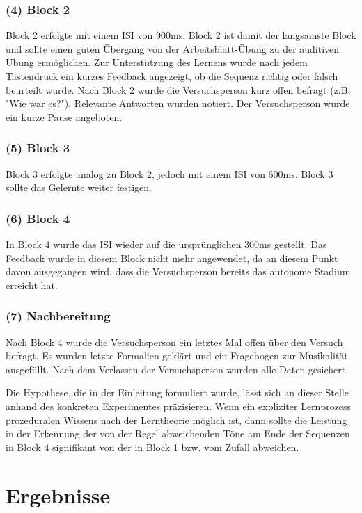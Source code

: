 \documentclass[doc,a4paper,12pt]{apa6}
\begin{document}
\subsubsection{(4) Block 2}

Block 2 erfolgte mit einem ISI von 900ms. Block 2 ist damit der langsamste Block und sollte einen guten Übergang von der Arbeitsblatt-Übung zu der auditiven Übung ermöglichen. Zur Unterstützung des Lernens wurde nach jedem Tastendruck ein kurzes Feedback angezeigt, ob die Sequenz richtig oder falsch beurteilt wurde. Nach Block 2 wurde die Versuchsperson kurz offen befragt (z.B. "Wie war es?"). Relevante Antworten wurden notiert. Der Versuchsperson wurde ein kurze Pause angeboten.

\subsubsection{(5) Block 3}

Block 3 erfolgte analog zu Block 2, jedoch mit einem ISI von 600ms. Block 3 sollte das Gelernte weiter festigen.

\subsubsection{(6) Block 4}

In Block 4 wurde das ISI wieder auf die ursprünglichen 300ms gestellt. Das Feedback wurde in diesem Block nicht mehr angewendet, da an diesem Punkt davon ausgegangen wird, dass die Versuchsperson bereits das autonome Stadium erreicht hat.

\subsubsection{(7) Nachbereitung}

Nach Block 4 wurde die Versuchsperson ein letztes Mal offen über den Versuch befragt. Es wurden letzte Formalien geklärt und ein Fragebogen zur Musikalität ausgefüllt. Nach dem Verlassen der Versuchsperson wurden alle Daten gesichert.

Die Hypothese, die in der Einleitung formuliert wurde, lässt sich an dieser Stelle anhand des konkreten Experimentes präzisieren. Wenn ein expliziter Lernprozess prozeduralen Wissens nach der Lerntheorie möglich ist, dann sollte die Leistung in der Erkennung der von der Regel abweichenden Töne am Ende der Sequenzen in Block 4 signifikant von der in Block 1 bzw. vom Zufall abweichen.

\section{Ergebnisse}
\end{document}
